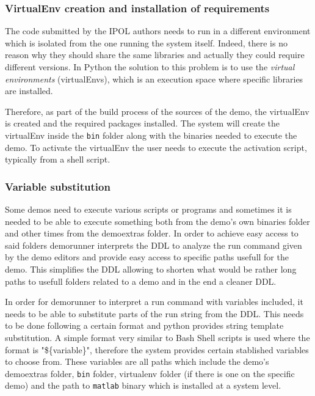 \subsubsection{VirtualEnv creation and installation of requirements}
\noindent

The code submitted by the IPOL authors needs to run in a different environment which is isolated from the one running the system itself. Indeed, there is no reason why they should share the same libraries and actually they could require different versions. In Python the solution to this problem is to use the \emph{virtual environments} (virtualEnvs), which is an execution space where specific libraries are installed.

Therefore, as part of the build process of the sources of the demo, the virtualEnv is created and the required packages installed.
%
The system will create the virtualEnv inside the {\tt bin} folder along with the binaries needed to execute the demo. To activate the virtualEnv the user needs to execute the activation script, typically from a shell script.


\subsubsection{Variable substitution}

Some demos need to execute various scripts or programs and sometimes it is needed to be able to execute something both from the demo's own binaries folder and other times  from the demoextras folder. In order to achieve easy access to said folders demorunner interprets the DDL to analyze the run command given by the demo editors and provide easy access to specific paths usefull for the demo. This simplifies the DDL allowing to shorten what would be rather long paths to usefull folders related to a demo and in the end a cleaner DDL.

In order for demorunner to interpret a run command with variables included, it needs to be able to substitute parts of the run string from the DDL. This needs to be done following a certain format and python provides string template substitution. A simple format very similar to Bash Shell scripts is used where the format is "\$\{variable\}", therefore the system provides certain stablished variables to choose from. These variables are all paths which include the demo's demoextras folder, {\tt bin} folder, virtualenv folder (if there is one on the specific demo) and the path to {\tt matlab} binary which is installed at a system level.

